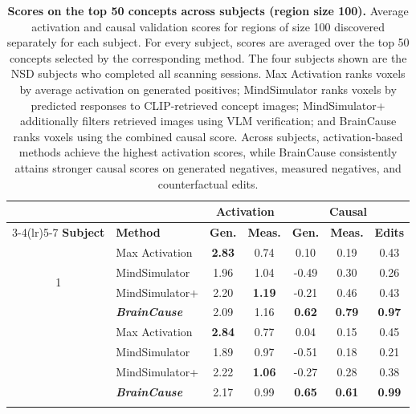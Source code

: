 \begin{table}[ht]
\centering
\setlength{\tabcolsep}{4pt}
\caption{\textbf{Scores on the top 50 concepts across subjects (region size 100).}
Average activation and causal validation scores for regions of size 100 discovered separately for each subject. 
For every subject, scores are averaged over the top 50 concepts selected by the corresponding method. 
The four subjects shown are the NSD subjects who completed all scanning sessions. 
Max Activation ranks voxels by average activation on generated positives; MindSimulator ranks voxels by predicted responses to CLIP-retrieved concept images; MindSimulator+ additionally filters retrieved images using VLM verification; and BrainCause ranks voxels using the combined causal score. 
Across subjects, activation-based methods achieve the highest activation scores, while BrainCause consistently attains stronger causal scores on generated negatives, measured negatives, and counterfactual edits.}
\vspace{+0.92cm}
\begin{tabular}{@{}clccccc@{}}
\toprule
& 
& \multicolumn{2}{c}{\textbf{Activation}}
& \multicolumn{3}{c}{\textbf{Causal}} \\
\cmidrule(lr){3-4}\cmidrule(lr){5-7}
\textbf{Subject}
& \textbf{Method}
& \textbf{Gen.}
& \textbf{Meas.}
& \textbf{Gen.}
& \textbf{Meas.}
& \textbf{Edits} \\
\midrule

\multirow{4}{*}{1}
& Max Activation
& \textbf{2.83} & 0.74 & 0.10 & 0.19 & 0.43 \\
& MindSimulator
& 1.96 & 1.04 & -0.49 & 0.30 & 0.26 \\
& MindSimulator+
& 2.20 & \textbf{1.19} & -0.21 & 0.46 & 0.43 \\
& \emph{\textbf{BrainCause}}
& 2.09 & 1.16 & \textbf{0.62} & \textbf{0.79} & \textbf{0.97} \\

\addlinespace[2pt]
\midrule

\multirow{4}{*}{2}
& Max Activation
& \textbf{2.84} & 0.77 & 0.04 & 0.15 & 0.45 \\
& MindSimulator
& 1.89 & 0.97 & -0.51 & 0.18 & 0.21 \\
& MindSimulator+
& 2.22 & \textbf{1.06} & -0.27 & 0.28 & 0.38 \\
& \emph{\textbf{BrainCause}}
& 2.17 & 0.99 & \textbf{0.65} & \textbf{0.61} & \textbf{0.99} \\

\addlinespace[2pt]
\midrule


\end{tabular}
\end{table}
